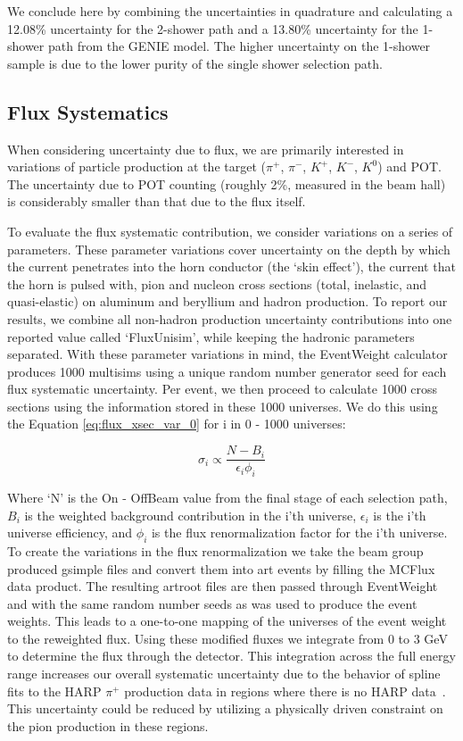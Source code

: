 We conclude here by combining the uncertainties in quadrature and calculating a 12.08\% uncertainty for the 2-shower path and a 13.80\% uncertainty for the 1-shower path from the GENIE model.  The higher uncertainty on the 1-shower sample is due to the lower purity of the single shower selection path.

\clearpage
\subsection{Flux Systematics}
When considering uncertainty due to flux, we are primarily interested in variations of particle production at the target ($\pi^+$, $\pi^-$, $K^+$, $K^-$, $K^0$) and POT.  The uncertainty due to POT counting (roughly 2\%, measured in the beam hall) is considerably smaller than that due to the flux itself. 
\par To evaluate the flux systematic contribution, we consider variations on a series of parameters.  These parameter variations cover uncertainty on the depth by which the current penetrates into the horn conductor (the ‘skin effect’), the current that the horn is pulsed with, pion and nucleon cross sections
(total, inelastic, and quasi-elastic) on aluminum and beryllium and hadron production. To report our results, we combine all non-hadron production uncertainty contributions into one reported value called `FluxUnisim', while keeping the hadronic parameters separated. With these parameter variations in mind, the EventWeight calculator produces 1000 multisims using a unique random number generator seed for each flux systematic uncertainty. Per event, we then proceed to calculate 1000 cross sections using the information stored in these 1000 universes.  We do this using the Equation \ref{eq:flux_xsec_var_0} for i in 0 - 1000 universes:

\begin{equation} \label{eq:flux_xsec_var_0}
  \sigma_i \propto \frac{N - B_i}{\epsilon_i \phi_i} 
\end{equation}

Where `N' is the On - OffBeam value from the final stage of each selection path, $B_i$ is the weighted background contribution in the i'th universe, $\epsilon_i$ is the i'th universe efficiency, and $\phi_i$ is the flux renormalization factor for the i'th universe. To create the variations in the flux renormalization we take the beam group produced gsimple files and convert them into art events by filling the MCFlux data product. The resulting artroot files are then passed through EventWeight and with the same random number seeds as was used to produce the event weights. This leads to a one-to-one mapping of the universes of the event weight to the reweighted flux. Using these modified fluxes we integrate from 0 to 3 GeV to determine the flux through the detector. This integration across the full energy range increases our overall systematic uncertainty due to the behavior of spline fits to the HARP $\pi^{+}$ production data in regions where there is no HARP data~\cite{bib:flux_uncertainty_tn}. This uncertainty could be reduced by utilizing a physically driven constraint on the pion production in these regions.   

